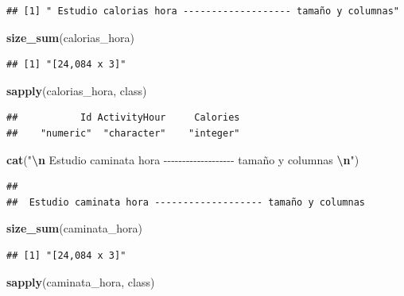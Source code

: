 \documentclass[
]{article}
\newenvironment{Shaded}{\begin{snugshade}}{\end{snugshade}}
\newcommand{\FunctionTok}[1]{\textcolor[rgb]{0.13,0.29,0.53}{\textbf{#1}}}
\newcommand{\NormalTok}[1]{#1}
\newcommand{\SpecialCharTok}[1]{\textcolor[rgb]{0.81,0.36,0.00}{\textbf{#1}}}
\newcommand{\StringTok}[1]{\textcolor[rgb]{0.31,0.60,0.02}{#1}}
\begin{document}
\begin{verbatim}
## [1] " Estudio calorias hora ------------------- tamaño y columnas"
\end{verbatim}

\begin{Shaded}
\begin{Highlighting}[]
\FunctionTok{size\_sum}\NormalTok{(calorias\_hora)}
\end{Highlighting}
\end{Shaded}

\begin{verbatim}
## [1] "[24,084 x 3]"
\end{verbatim}

\begin{Shaded}
\begin{Highlighting}[]
\FunctionTok{sapply}\NormalTok{(calorias\_hora, class)}
\end{Highlighting}
\end{Shaded}

\begin{verbatim}
##           Id ActivityHour     Calories 
##    "numeric"  "character"    "integer"
\end{verbatim}

\begin{Shaded}
\begin{Highlighting}[]
\FunctionTok{cat}\NormalTok{(}\StringTok{"}\SpecialCharTok{\textbackslash{}n}\StringTok{ Estudio caminata hora {-}{-}{-}{-}{-}{-}{-}{-}{-}{-}{-}{-}{-}{-}{-}{-}{-}{-}{-} tamaño y columnas }\SpecialCharTok{\textbackslash{}n}\StringTok{"}\NormalTok{)}
\end{Highlighting}
\end{Shaded}

\begin{verbatim}
## 
##  Estudio caminata hora ------------------- tamaño y columnas
\end{verbatim}

\begin{Shaded}
\begin{Highlighting}[]
\FunctionTok{size\_sum}\NormalTok{(caminata\_hora)}
\end{Highlighting}
\end{Shaded}

\begin{verbatim}
## [1] "[24,084 x 3]"
\end{verbatim}

\begin{Shaded}
\begin{Highlighting}[]
\FunctionTok{sapply}\NormalTok{(caminata\_hora, class)}
\end{Highlighting}
\end{Shaded}
\end{document}
